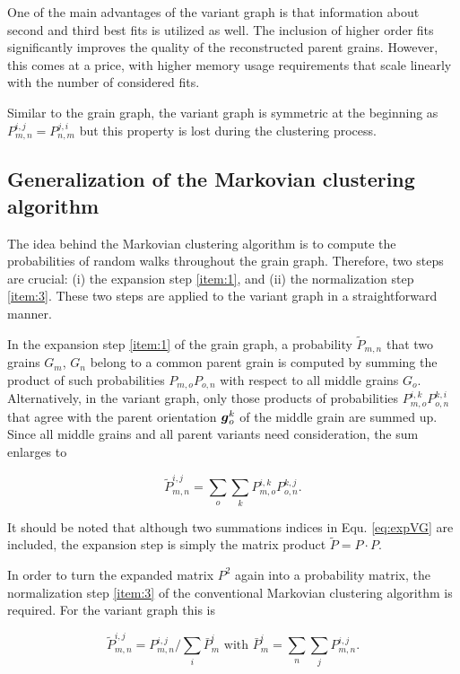 \documentclass{elsarticle}
\renewcommand{\vec}[1]{\ensuremath \mathbf{\boldsymbol{#1}}}
\numberwithin{equation}{section}
\begin{document}
One of the main advantages of the variant graph is that information about second and third best fits is utilized as well. The inclusion of higher order fits significantly improves the quality of the reconstructed parent grains. However, this comes at a price, with higher memory usage requirements that scale linearly with the number of considered fits. 

Similar to the grain graph, the variant graph is symmetric at the beginning as $P_{m,n}^{i,j} = P_{n,m}^{j,i}$ but this property is lost during the clustering process.  



\subsection{Generalization of the Markovian clustering algorithm}
\label{sec:general-markovian}
The idea behind the Markovian clustering algorithm is to compute the probabilities of random walks throughout the grain graph. Therefore, two steps are crucial: (i) the expansion step \ref{item:1}, and (ii) the normalization step \ref{item:3}. These two steps are applied to the variant graph in a straightforward manner.  

In the expansion step \ref{item:1} of the grain graph, a probability $\tilde P_{m,n}$ that two grains $G_m$, $G_n$ belong to a common parent grain is computed by summing the product of such probabilities $P_{m,o} P_{o,n}$ with respect to all middle grains $G_o$. Alternatively, in the variant graph, only those products of probabilities $P_{m,o}^{i,k} P_{o,n}^{k,i}$ that agree with the parent orientation $\vec g_o^k$ of the middle grain are summed up. Since all middle grains and all parent variants need consideration, the sum enlarges to 

\begin{equation}
  \label{eq:expVG}
  \tilde P_{m,n}^{i,j}
  = \sum_{o} \sum_{k}
   P_{m,o}^{i,k} P_{o,n}^{k,j}.
\end{equation}

It should be noted that although two summations indices in Equ. \eqref{eq:expVG} are included, the expansion step is simply the matrix product $\tilde P = P \cdot P$.

In order to turn the expanded matrix $P^2$ again into a probability matrix, the normalization step \ref{item:3} of the conventional Markovian clustering algorithm is required. For the variant graph this is

\begin{equation*}
  \tilde P_{m,n}^{i,j}
  = P_{m,n}^{i,j} / \sum_{i} \bar P_m^i
  \text{ with }
  \bar P_{m}^{i}
  = \sum_n \sum_j P_{m,n}^{i,j}.
\end{equation*}
\end{document}
